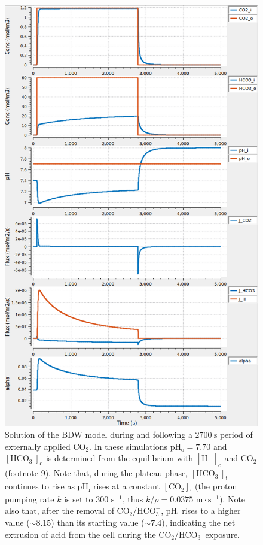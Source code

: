 \documentclass[fleqn,10pt]{physiome}
\begin{document}
\begin{figure}[ht!]
\centering
\includegraphics[width=0.8\linewidth]{img/Figure 4.png}
\caption{\label{fig:4} Solution of the BDW model during and following a $2700~\mathrm{s}$ period of externally applied $\mathrm{CO_2}$. In these simulations $\mathrm{pH_o}=7.70$ and $\mathrm{[HCO_3^-]_o}$ is determined from the equilibrium with $\mathrm{[H^+]_o}$ and $\mathrm{CO_2}$ (footnote 9). Note that, during the plateau phase, $\mathrm{[HCO_3^-]_i}$ continues to rise as $\mathrm{pH_i}$ rises at a constant $\mathrm{[CO_2]_i}$ (the proton pumping rate $k$ is set to $300$ $\mathrm{s^{-1}}$, thus $k/\rho= 0.0375$ $\mathrm{m\cdot s^{-1}}$). Note also that, after the removal of $\mathrm{CO_2}/\mathrm{HCO_3^-}$, $\mathrm{pH_i}$ rises to a higher value ($\sim 8.15$) than its starting value ($\sim 7.4$), indicating the net extrusion of acid from the cell during the $\mathrm{CO_2}/\mathrm{HCO_3^-}$ exposure.}
\end{figure}
\end{document}
